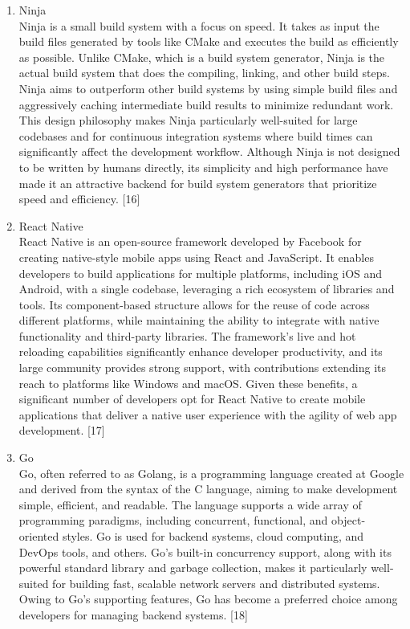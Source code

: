 \documentclass[conference]{IEEEtran}
\begin{document}
\begin{enumerate}[label=\arabic*.]
\begin{enumerate}[label=\alph*.]
\item Ninja\\
Ninja is a small build system with a focus on speed. It takes as input the build files generated by tools like CMake and executes the build as efficiently as possible. Unlike CMake, which is a build system generator, Ninja is the actual build system that does the compiling, linking, and other build steps. Ninja aims to outperform other build systems by using simple build files and aggressively caching intermediate build results to minimize redundant work. This design philosophy makes Ninja particularly well-suited for large codebases and for continuous integration systems where build times can significantly affect the development workflow. Although Ninja is not designed to be written by humans directly, its simplicity and high performance have made it an attractive backend for build system generators that prioritize speed and efficiency. [16]\\
\item React Native\\
React Native is an open-source framework developed by Facebook for creating native-style mobile apps using React and JavaScript. It enables developers to build applications for multiple platforms, including iOS and Android, with a single codebase, leveraging a rich ecosystem of libraries and tools. Its component-based structure allows for the reuse of code across different platforms, while maintaining the ability to integrate with native functionality and third-party libraries. The framework's live and hot reloading capabilities significantly enhance developer productivity, and its large community provides strong support, with contributions extending its reach to platforms like Windows and macOS. Given these benefits, a significant number of developers opt for React Native to create mobile applications that deliver a native user experience with the agility of web app development. [17]\\
\item Go\\
Go, often referred to as Golang, is a programming language created at Google and derived from the syntax of the C language, aiming to make development simple, efficient, and readable. The language supports a wide array of programming paradigms, including concurrent, functional, and object-oriented styles. Go is used for backend systems, cloud computing, and DevOps tools, and others. Go's built-in concurrency support, along with its powerful standard library and garbage collection, makes it particularly well-suited for building fast, scalable network servers and distributed systems. Owing to Go’s supporting features, Go has become a preferred choice among developers for managing backend systems. [18]\\
\end{enumerate}
\end{enumerate}
\end{document}
